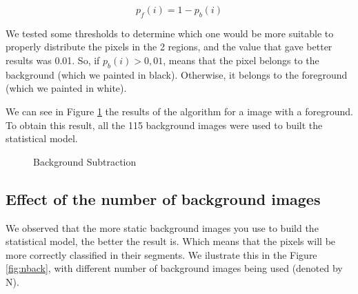 \documentclass{article}
\begin{document}
	\begin{equation}
	 p_f(i)=1-p_b(i)  
	\end{equation}

	We tested some thresholds to determine which one would be more suitable to properly distribute the pixels in the 2 regions, and the value that gave better results was 0.01. So, if {$p_b(i)>0,01$}, means that the pixel belongs to the background (which we painted in black). Otherwise, it belongs to the foreground (which we painted in white). 

	We can see in Figure \ref{fig:img_000053} the results of the algorithm for a image with a foreground. To obtain this result, all the 115 background images were used to built the statistical model.

	\begin{figure}[H]
		  \centering
		  \caption{Background Subtraction}
		  \label{fig:img_000053}
	\end{figure}

\subsection{Effect of the number of background images}

	We observed that the more static background images you use to build the statistical model, the better the result is. Which means that the pixels will be more correctly classified in their segments. We ilustrate this in the Figure \ref{fig:nback}, with different number of background images being used (denoted by N). 
\end{document}
